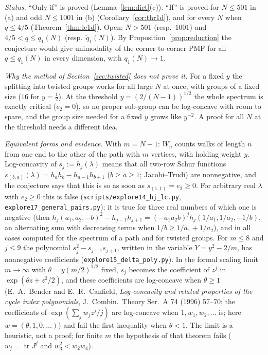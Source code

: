 \documentclass[11pt,a4paper]{article}
\theoremstyle{definition}
\begin{document}
\emph{Status.} ``Only if'' is proved (Lemma~\ref{lem:dict}(c)). ``If'' is proved for $N\le501$ in (a) and odd $N\le1001$ in (b) (Corollary~\ref{cor:thr1d}), and for every $N$ when $q\le4/5$ (Theorem~\ref{thm:lc1d}). Open: $N>501$ (resp.\ $1001$) and $4/5<q\le q_1(N)$ (resp.\ $\tilde q_1(N)$). By Proposition~\ref{prop:reduction} the conjecture would give unimodality of the corner-to-corner PMF for all $q\le q_1(N)$ in every dimension, with $q_1(N)\to1$.

\emph{Why the method of Section~\ref{sec:twisted} does not prove it.} For a fixed $y$ the splitting into twisted groups works for all large $N$ at once, with groups of a fixed size ($16$ for $y=\frac12$). At the threshold $y=(2/(N-1))^{1/2}$ the whole spectrum is exactly critical ($e_2=0$), so no proper sub-group can be log-concave with room to spare, and the group size needed for a fixed $y$ grows like $y^{-2}$. A proof for all $N$ at the threshold needs a different idea.

\emph{Equivalent forms and evidence.} With $m=N-1$: $W_n$ counts walks of length $n$ from one end to the other of the path with $m$ vertices, with holding weight $y$. Log-concavity of $s_j:=h_j(\lambda)$ means that all two-row Schur functions $s_{(b,a)}(\lambda)=h_ah_b-h_{a-1}h_{b+1}$ ($b\ge a\ge1$; Jacobi--Trudi) are nonnegative, and the conjecture says that this is so as soon as $s_{(1,1)}=e_2\ge0$. For arbitrary real $\lambda$ with $e_2\ge0$ this is false (\texttt{scripts/explore14\_hj\_lc.py}, \texttt{explore17\_general\_pairs.py}); it is true for three real numbers of which one is negative (then $h_j(a_1,a_2,-b)^2-h_{j-1}h_{j+1}=(-a_1a_2b)^jh_j(1/a_1,1/a_2,-1/b)$, an alternating sum with decreasing terms when $1/b\ge1/a_1+1/a_2$), and in all cases computed for the spectrum of a path and for twisted groups. For $m\le8$ and $j\le9$ the polynomial $s_j^2-s_{j-1}s_{j+1}$, written in the variable $Y=y^2-2/m$, has nonnegative coefficients (\texttt{explore15\_delta\_poly.py}). In the formal scaling limit $m\to\infty$ with $\theta=y(m/2)^{1/2}$ fixed, $s_j$ becomes the coefficient of $z^j$ in $\exp(\theta z+z^2/2)$, and these coefficients are log-concave when $\theta\ge1$ (E.~A.~Bender and E.~R.~Canfield, \emph{Log-concavity and related properties of the cycle index polynomials}, J.~Combin.\ Theory Ser.~A 74 (1996) 57--70: the coefficients of $\exp(\sum_jw_jz^j/j)$ are log-concave when $1,w_1,w_2,\dots$ is; here $w=(\theta,1,0,\dots)$) and fail the first inequality when $\theta<1$. The limit is a heuristic, not a proof; for finite $m$ the hypothesis of that theorem fails ($w_j=\operatorname{tr}J^j$ and $w_3^2<w_2w_4$).
\end{document}
